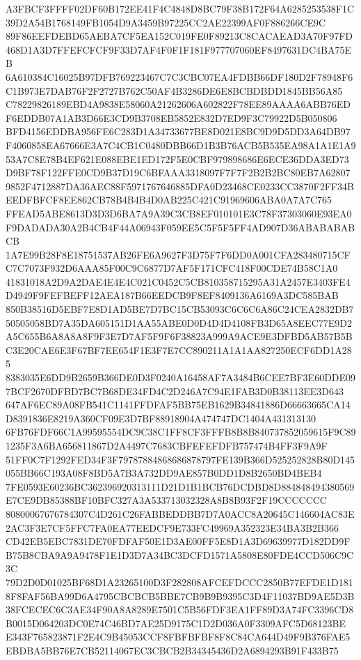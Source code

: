 \documentclass[UTF8,fontset=fandol,zihao=-4,a4paper]{ctexart}
\begin{document}
{{A3FBCF3FFFF02DF60B172EE41F4C4848D8BC79F38B172F64A6285253538F1C39D2A54B1768149FB1054D9A3459B97225CC2AE22399AF0F886266CE9C
89F86EEFDEBD65AEBA7CF5EA152C019FE0F89213C8CACAEAD3A70F97FD468D1A3D7FFEFCFCF9F33D7AF4F0F1F181F977707060EF8497631DC4BA75EB
6A610384C16025B97DFB769223467C7C3CBC07EA4FDBB66DF180D2F78948F6C1B973E7DAB76F2F2727B762C50AF4B3286DE6E8BCBDBDD1845BB56A85
C78229826189EBD4A9838E58060A21262606A602822F78EE89AAAA6ABB76EDF6EDDB07A1AB3D66E3CD9B3708EB5852E832D7ED9F3C79922D5B050806
BFD4156EDDBA956FE6C283D1A34733677BE8D021E8BC9D9D5DD3A64DB97F4060858EA67666E3A7C4CB1C0480DBB66D1B3B76ACB5B535EA98A1A1E1A9
53A7C8E78B4EF621E088EBE1ED172F5E0CBF979898686E6ECE36DDA3ED73D9BF78F122FFE0CD9B37D19C6BFAAA3318097F7F7F2B2B2BC80EB7A62807
9852F4712887DA36AEC88F5971767646885DFA0D23468CE0233CC3870F2FF34BEEDFBFCF8EE862CB78B4B4B4D0AB225C421C91969606ABA0A7A7C765
FFEAD5ABE8613D3D3D6BA7A9A39C3CB8EF010101E3C78F37303060E93EA0F9DADADA30A2B4CB4F44A06943F059EE5C5F5F5FF4AD907D36ABABABABCB
1A7E99B28F8E18751537AB26FE6A9627F3D75F7F6DD0A001CFA283480715CFC7C7073F932D6AAA85F00C9C6877D7AF5F171CFC418F00CDE74B58C1A0
41831018A2D9A2DAE4E4E4C021C0452C5CB810358715295A31A2457E3403FE4D4949F9FEFBEFF12AEA187B66EEDCB9F8EF8409136A6169A3DC585BAB
850B38516D5EBF7E8D1AD5BE7D7BC15CB53093C6C6C6A86C24CEA2832DB750505058BD7A35DA605151D1AA55ABE0D0D4D4D4108FB3D65A8EEC77E9D2
A5C655B6A8A8A8F9F3E7D7AF5F9F6F38823A999A9ACE9E3DFBD5AB57B5BC3E20CAE6E3F67BF7EE654F1E3F7E7CC890211A1A1AA827250ECF6DD1A285
8383035E6DD9B2659B366DE0D3F0240A16458AF7A3484B6CEE7BF3E60DDE097BCF2670DFBD7BC7B68DE34FD4C2D246A7C94E1FAB3D0B38113EE3D643
647AF6EC89A08FB541C1141FFDFAF5BB75EB1629B34841886D66663665CA14D8391836E8219A360CF09E3D7BF88918904A474747DC1404A431313130
6FB76FDF66C1A99595554DC9C38C1FF8CF3FFFB8B8B840737852059615F9C891235F3A6BA656811867D2A4497C7683CBFEFEFDFB757474B4FF3F9A9F
51FF0C7F1292FED34F3F79787884868686878797FE139B366D525252828B80D145055BB66C193A08F8BD5A7B3A732DD9AE857B0DD1D8B2650BD4BEB4
7FE0593E60236BC362396920313111D21D1B1BCB76DCDBD8D884848494380569E7CE9DB85388BF10BFC327A3A533713032328A8B8B93F2F19CCCCCCC
80800067676784307C4D261C26FABBEDDBB7D7A0ACC8A20645C146604AC83E2AC3F3E7CF5FFC7FA0EA77EEDCF9E733FC49969A352323E34BA3B2B366
CD42EB5EBC7831DE70FDFAF50E1D3AE00FF5E8D1A3D69639977D182DD9FB75B8CBA9A9A9478F1E1D3D7A34BC3DCFD1571A5808E80FDE4CCD506C9C3C
79D2D0D01025BF68D1A23265100D3F282808AFCEFDCCC2850B77EFDE1D1818F8FAF56BA99D6A4795CBCBCB5BBE7CB9B9B9395C3D4F11037BD9AE5D3B
38FCECEC6C3AE34F90A8A8289E7501C5B56FDF3EA1FF89D3A74FC3396CD8B0015D064203DC0E74C46BD7AE25D9175C1D2D036A0F3309AFC5D68123BE
E343F765823871F2E4C9B45053CCF8FBFBFBF8F8C84CA644D49F9B376FAE5EBDBA5BB76E7CB52114067EC3CBCB2B34345436D2A6894293B91F433B75
}}
\end{document}
